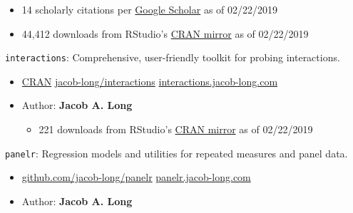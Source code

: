 \documentclass[letterpaper,MMMyyyy,nonstopmode]{simplecv}
\def\tightlist{} %
\begin{document}
\begin{Body}
\begin{itemize}
  \begin{itemize}
  \tightlist
  \item
    14 scholarly citations per
    \href{https://scholar.google.com/scholar?oi=bibs\&hl=en\&cites=9332474636617245381,8245268343852705630}{Google
    Scholar} as of 02/22/2019
  \item
    44,412 downloads from RStudio's
    \href{https://r-pkg.org/services\#cranlogs}{CRAN mirror} as of
    02/22/2019
  \end{itemize}
\end{itemize}

\normalsize

\texttt{interactions}: Comprehensive, user-friendly toolkit for probing
interactions.

\small 
\vspace{-.05in}

\begin{itemize}
\tightlist
\item
  \href{https://CRAN.R-project.org/package=interactions}{CRAN}
  \hspace{.03in} \textbullet \hspace{.05in} \faGithub \hspace{.02in}
  \href{https://github.com/jacob-long/interactions}{jacob-long/interactions}
  \hspace{.03in} \textbullet \hspace{.05in} \faGlobe \hspace{.02in}
  \href{https://interactions.jacob-long.com}{interactions.jacob-long.com}
\item
  Author: \textbf{Jacob A. Long}

  \begin{itemize}
  \tightlist
  \item
    221 downloads from RStudio's
    \href{https://r-pkg.org/services\#cranlogs}{CRAN mirror} as of
    02/22/2019
  \end{itemize}
\end{itemize}

\normalsize

\texttt{panelr}: Regression models and utilities for repeated measures
and panel data.

\small 
\vspace{-.05in}

\begin{itemize}
\tightlist
\item
  \faGithub \hspace{.02in}
  \href{https://github.com/jacob-long/panelr}{github.com/jacob-long/panelr}
  \hspace{.03in} \textbullet \hspace{.05in} \faGlobe \hspace{.02in}
  \href{https://panelr.jacob-long.com}{panelr.jacob-long.com}
\item
  Author: \textbf{Jacob A. Long}
\end{itemize}


\end{Body}
\end{document}
